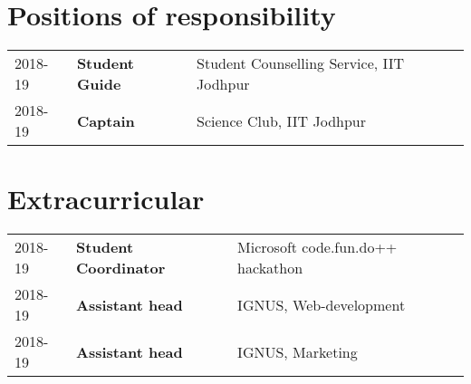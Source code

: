 \documentclass[a4paper]{deedy-resume-openfont}
\begin{document}
\begin{minipage}[t]{0.63\textwidth}

\section{Positions of responsibility}
\begin{tabular}{ l l l }
2018-19 & \textbf{Student Guide} & Student Counselling Service, IIT Jodhpur \\
2018-19 & \textbf{Captain} & Science Club, IIT Jodhpur \\  
\end{tabular}

\section{Extracurricular}
\begin{tabular}{ l l l }
 2018-19 & \textbf{Student Coordinator} & Microsoft code.fun.do++ hackathon\\
 2018-19 & \textbf{Assistant head} & IGNUS, Web-development \\ 2018-19 & \textbf{Assistant head} & IGNUS, Marketing
 \end{tabular}
 
\end{minipage} 
\end{document}
